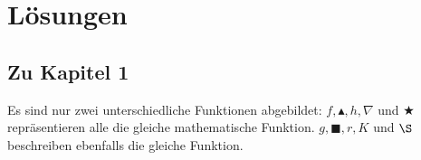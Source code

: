\documentclass[12pt]{article}
\begin{document}
%
%
\newpage
\section{Lösungen}
\subsection{Zu Kapitel 1}
\begin{solution}%
Es sind nur zwei unterschiedliche Funktionen abgebildet: $f, \blacktriangle, h, \nabla$ und $\bigstar$ repräsentieren alle die gleiche mathematische Funktion.
$g, \blacksquare, r, K$ und $\S$ beschreiben ebenfalls die gleiche Funktion.
\end{solution}
\end{document}
